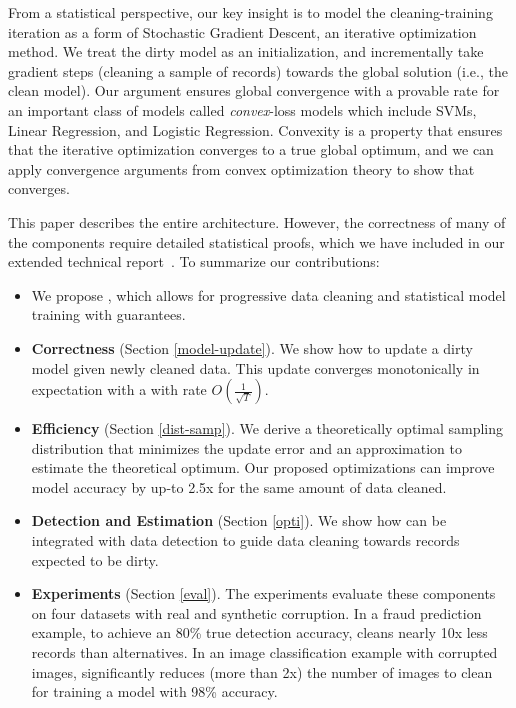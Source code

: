 From a statistical perspective, our key insight is to model the cleaning-training iteration as a form of Stochastic Gradient Descent, an iterative optimization method.
We treat the dirty model as an initialization, and incrementally take gradient steps (cleaning a sample of records) towards the global solution (i.e., the clean model).
Our argument ensures global convergence with a provable rate for an important class of models called \emph{convex}-loss models which include SVMs, Linear Regression, and Logistic Regression.
Convexity is a property that ensures that the iterative optimization converges to a true global optimum, and we can apply convergence arguments from convex optimization theory to show that \sys converges.

This paper describes the entire \sys architecture. However, the correctness of many of the components require detailed statistical proofs, which we have included in our extended technical report~\cite{activecleanarxiv}. To summarize our contributions:
\begin{itemize}[noitemsep]
\item We propose \sys, which allows for progressive data cleaning and statistical model training with guarantees.
\item \textbf{Correctness} (Section \ref{model-update}). We show how to update a dirty model given newly cleaned data. This update converges monotonically in expectation with a with rate $O(\frac{1}{\sqrt{T}})$.
\item \textbf{Efficiency} (Section \ref{dist-samp}). We derive a theoretically optimal sampling distribution that minimizes the update error and an approximation to estimate the theoretical optimum. Our proposed optimizations can improve model accuracy by up-to 2.5x for the same amount of data cleaned.
\item \textbf{Detection and Estimation} (Section \ref{opti}). We show how \sys can be integrated with data detection to guide data cleaning towards records expected to be dirty.
\item \textbf{Experiments} (Section \ref{eval}). The experiments evaluate these components on four datasets with real and synthetic corruption. In a fraud prediction example, to achieve an 80\% true detection accuracy, \sys cleans nearly 10x less records than alternatives. In an image classification example with corrupted images, \sys significantly reduces
(more than 2x) the number of images to clean for training a model with 98\% accuracy.
\end{itemize}






